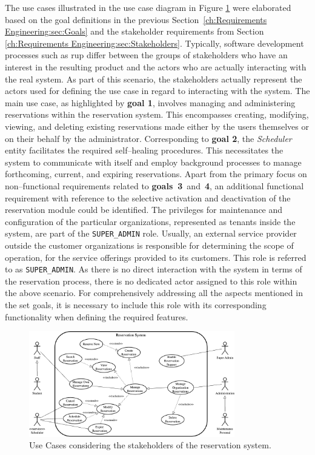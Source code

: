 The use cases illustrated in the use case diagram in Figure \ref{fig:use-cases} were elaborated based on the goal definitions in the previous Section~\ref{ch:Requirements Engineering:sec:Goals} and the stakeholder requirements from Section \ref{ch:Requirements Engineering:sec:Stakeholders}.
Typically, software development processes such as \acrshort{rup} \cite{kruchten_rational_1999} differ between the groups of stakeholders who have an interest in the resulting product and the actors who are actually interacting with the real system.
As part of this scenario, the stakeholders actually represent the actors used for defining the use case in regard to interacting with the system.
The main use case, as highlighted by \textbf{goal 1}, involves managing and administering reservations within the reservation system. This encompasses creating, modifying, viewing, and deleting existing reservations made either by the users themselves or on their behalf by the administrator.
Corresponding to \textbf{goal 2}, the \textit{Scheduler} entity facilitates the required self--healing procedures. This necessitates the system to communicate with itself and employ background processes to manage forthcoming, current, and expiring reservations.
Apart from the primary focus on non--functional requirements related to \textbf{goals~3}~and~\textbf{4}, an additional functional requirement with reference to the selective activation and deactivation of the reservation module could be identified.
The privileges for maintenance and configuration of the particular organizations, represented as tenants inside the system, are part of the \verb|SUPER_ADMIN| role.
Usually, an external service provider outside the customer organizations is responsible for determining the scope of operation, for the service offerings provided to its customers. This role is referred to as \verb|SUPER_ADMIN|. As there is no direct interaction with the system in terms of the reservation process, there is no dedicated actor assigned to this role within the above scenario.
For comprehensively addressing all the aspects mentioned in the set goals, it is necessary to include this role with its corresponding functionality when defining the required features.

\begin{figure}[h]
    \centering
    \includegraphics[width=0.8\textwidth,keepaspectratio]{resources/images/main/2_requirements_engineering/UseCases.png}
    \caption{Use Cases considering the stakeholders of the reservation system.}
    \label{fig:use-cases}
\end{figure}
